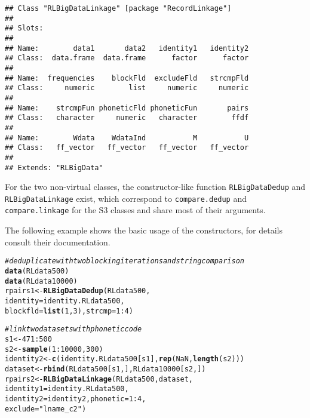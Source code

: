 \documentclass[a4paper]{article}\usepackage[]{graphicx}\usepackage[]{color}
\makeatletter
\newcommand{\hlnum}[1]{\textcolor[rgb]{0.686,0.059,0.569}{#1}}%
\newcommand{\hlstr}[1]{\textcolor[rgb]{0.192,0.494,0.8}{#1}}%
\newcommand{\hlcom}[1]{\textcolor[rgb]{0.678,0.584,0.686}{\textit{#1}}}%
\newcommand{\hlopt}[1]{\textcolor[rgb]{0,0,0}{#1}}%
\newcommand{\hlstd}[1]{\textcolor[rgb]{0.345,0.345,0.345}{#1}}%
\newcommand{\hlkwb}[1]{\textcolor[rgb]{0.69,0.353,0.396}{#1}}%
\newcommand{\hlkwc}[1]{\textcolor[rgb]{0.333,0.667,0.333}{#1}}%
\newcommand{\hlkwd}[1]{\textcolor[rgb]{0.737,0.353,0.396}{\textbf{#1}}}%
\newenvironment{kframe}{%
 \def\at@end@of@kframe{}%
 \ifinner\ifhmode%
  \def\at@end@of@kframe{\end{minipage}}%
  \begin{minipage}{\columnwidth}%
 \fi\fi%
 \def\FrameCommand##1{\hskip\@totalleftmargin \hskip-\fboxsep
 \colorbox{shadecolor}{##1}\hskip-\fboxsep
     \hskip-\linewidth \hskip-\@totalleftmargin \hskip\columnwidth}%
 \MakeFramed {\advance\hsize-\width
   \@totalleftmargin\z@ \linewidth\hsize
   \@setminipage}}%
 {\par\unskip\endMakeFramed%
 \at@end@of@kframe}
\newenvironment{knitrout}{}{} %
\makeatother
\begin{document}
\begin{knitrout}
\begin{kframe}
\begin{verbatim}
## Class "RLBigDataLinkage" [package "RecordLinkage"]
## 
## Slots:
##                                                       
## Name:        data1       data2   identity1   identity2
## Class:  data.frame  data.frame      factor      factor
##                                                       
## Name:  frequencies    blockFld  excludeFld   strcmpFld
## Class:     numeric        list     numeric     numeric
##                                                       
## Name:    strcmpFun phoneticFld phoneticFun       pairs
## Class:   character     numeric   character        ffdf
##                                                       
## Name:        Wdata    WdataInd           M           U
## Class:   ff_vector   ff_vector   ff_vector   ff_vector
## 
## Extends: "RLBigData"
\end{verbatim}
\end{kframe}
\end{knitrout}

For the two non-virtual classes, the constructor-like function \texttt{RLBigDataDedup}
and \texttt{RLBigDataLinkage} exist, which correspond
to \texttt{compare.dedup} and \texttt{compare.linkage} for the S3 classes and
share most of their arguments.

The following example shows the basic usage of the constructors, for details
consult their documentation.

\begin{knitrout}
\color{fgcolor}\begin{kframe}
\begin{alltt}
\hlcom{# deduplicate with two blocking iterations and string comparison}
\hlkwd{data}\hlstd{(RLdata500)}
\hlkwd{data}\hlstd{(RLdata10000)}
\hlstd{rpairs1} \hlkwb{<-} \hlkwd{RLBigDataDedup}\hlstd{(RLdata500,}
           \hlkwc{identity} \hlstd{= identity.RLdata500,}
           \hlkwc{blockfld} \hlstd{=} \hlkwd{list}\hlstd{(}\hlnum{1}\hlstd{,}\hlnum{3}\hlstd{),} \hlkwc{strcmp} \hlstd{=} \hlnum{1}\hlopt{:}\hlnum{4}\hlstd{)}

\hlcom{# link two datasets with phonetic code}
\hlstd{s1} \hlkwb{<-} \hlnum{471}\hlopt{:}\hlnum{500}
\hlstd{s2} \hlkwb{<-} \hlkwd{sample}\hlstd{(}\hlnum{1}\hlopt{:}\hlnum{10000}\hlstd{,} \hlnum{300}\hlstd{)}
\hlstd{identity2} \hlkwb{<-} \hlkwd{c}\hlstd{(identity.RLdata500[s1],} \hlkwd{rep}\hlstd{(}\hlnum{NaN}\hlstd{,} \hlkwd{length}\hlstd{(s2)))}
\hlstd{dataset} \hlkwb{<-} \hlkwd{rbind}\hlstd{(RLdata500[s1,], RLdata10000[s2,])}
\hlstd{rpairs2} \hlkwb{<-} \hlkwd{RLBigDataLinkage}\hlstd{(RLdata500, dataset,}
           \hlkwc{identity1} \hlstd{= identity.RLdata500,}
           \hlkwc{identity2} \hlstd{= identity2,} \hlkwc{phonetic} \hlstd{=} \hlnum{1}\hlopt{:}\hlnum{4}\hlstd{,}
           \hlkwc{exclude} \hlstd{=} \hlstr{"lname_c2"}\hlstd{)}
\end{alltt}
\end{kframe}
\end{knitrout}
\end{document}
